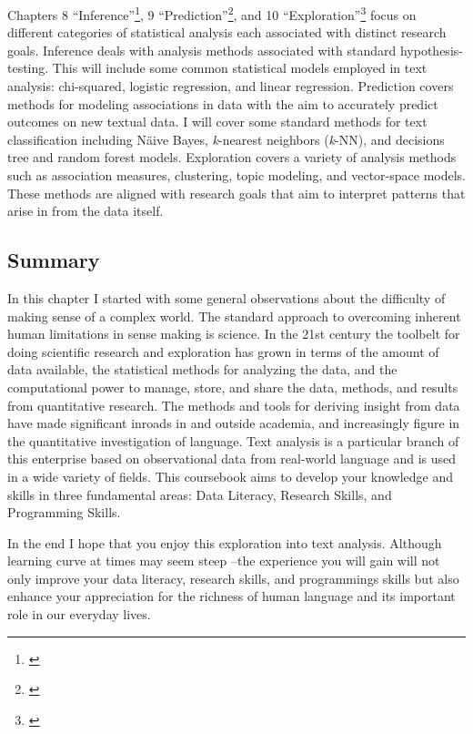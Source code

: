 \documentclass[
]{article}
\DeclareRobustCommand{\href}[2]{#2\footnote{\url{#1}}}
\begin{document}
\href{}{Chapters 8 ``Inference''}, \href{}{9 ``Prediction''}, and \href{}{10 ``Exploration''} focus on different categories of statistical analysis each associated with distinct research goals. Inference deals with analysis methods associated with standard hypothesis-testing. This will include some common statistical models employed in text analysis: chi-squared, logistic regression, and linear regression. Prediction covers methods for modeling associations in data with the aim to accurately predict outcomes on new textual data. I will cover some standard methods for text classification including Näive Bayes, \emph{k}-nearest neighbors (\emph{k}-NN), and decisions tree and random forest models. Exploration covers a variety of analysis methods such as association measures, clustering, topic modeling, and vector-space models. These methods are aligned with research goals that aim to interpret patterns that arise in from the data itself.

\hypertarget{summary}{%
\subsection*{Summary}\label{summary}}

In this chapter I started with some general observations about the difficulty of making sense of a complex world. The standard approach to overcoming inherent human limitations in sense making is science. In the 21st century the toolbelt for doing scientific research and exploration has grown in terms of the amount of data available, the statistical methods for analyzing the data, and the computational power to manage, store, and share the data, methods, and results from quantitative research. The methods and tools for deriving insight from data have made significant inroads in and outside academia, and increasingly figure in the quantitative investigation of language. Text analysis is a particular branch of this enterprise based on observational data from real-world language and is used in a wide variety of fields. This coursebook aims to develop your knowledge and skills in three fundamental areas: Data Literacy, Research Skills, and Programming Skills.

In the end I hope that you enjoy this exploration into text analysis. Although learning curve at times may seem steep --the experience you will gain will not only improve your data literacy, research skills, and programmings skills but also enhance your appreciation for the richness of human language and its important role in our everyday lives.
\end{document}
